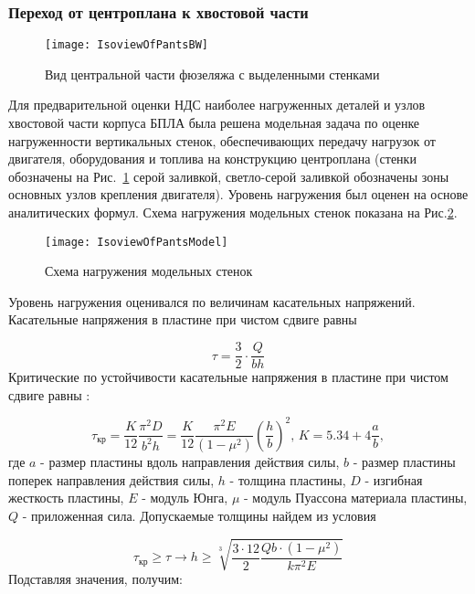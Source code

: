  \subsubsection{Переход от центроплана к хвостовой части} 

\begin{figure}[H]
\centering
\texttt{[image: IsoviewOfPantsBW]}
\caption{Вид центральной части фюзеляжа с выделенными стенками}
\label{IsoviewOfPants}
\end{figure}

Для предварительной оценки НДС наиболее нагруженных деталей и узлов хвостовой части корпуса БПЛА была решена модельная задача по оценке нагруженности вертикальных стенок, обеспечивающих передачу нагрузок от двигателя, оборудования и топлива на конструкцию центроплана (стенки обозначены на Рис.~\ref{IsoviewOfPants} серой заливкой, светло-серой заливкой обозначены зоны основных узлов крепления двигателя). Уровень нагружения был оценен на основе аналитических формул. Схема нагружения модельных стенок показана на Рис.\ref{IsoviewOfPantsModel}.

\begin{figure}[H]
\centering
\texttt{[image: IsoviewOfPantsModel]}
\caption{Схема нагружения модельных стенок}
\label{IsoviewOfPantsModel}
\end{figure}


Уровень нагружения оценивался по величинам касательных напряжений. Касательные напряжения в пластине при чистом сдвиге равны

\begin{equation}
\tau=\frac{3}{2}\cdot\frac{Q}{bh}
\end{equation}
Критические по устойчивости касательные напряжения в пластине при чистом сдвиге равны \cite{Volmir}:

\begin{equation}
\tau_\text{кр}=\frac{K}{12}\frac{\pi^2D}{b^2h} = \frac{K}{12}\frac{\pi^2E}{(1-\mu^2)}\left(\frac{h}{b}\right)^2,\, K=5.34 + 4\frac{a}{b},
\end{equation}
где $a$ - размер пластины вдоль направления действия силы, $b$ - размер пластины поперек направления действия силы, $h$ - толщина пластины, $D$ - изгибная жесткость пластины, $E$ - модуль Юнга, $\mu$ - модуль Пуассона материала пластины, $Q$ - приложенная сила.
Допускаемые толщины найдем из условия

\begin{equation}
\tau_\text{кр} \geq \tau \to h \geq \sqrt[3]{\frac{3\cdot12}{2}\frac{Qb\cdot(1-\mu^2)}{k\pi^2E}} 
\end{equation}
Подставляя значения, получим:

